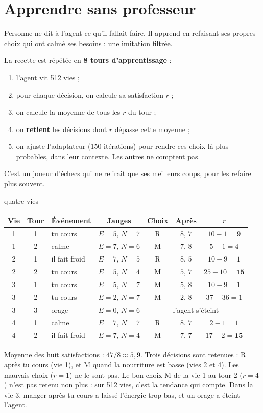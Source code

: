 \documentclass[fontsize=10pt,paper=a4,parskip=half-]{scrartcl}
\newcommand{\lead}[1]{{\fontsize{12}{16.5}\selectfont\color{ink!85!black}#1\par}\vspace{0.3em}}
\newcommand{\q}[1]{\og #1\fg{}}
\begin{document}
\section{Apprendre sans professeur}
\label{sec:apprendre}

\lead{Personne ne dit à l'agent ce qu'il fallait faire. Il apprend en refaisant ses
propres choix qui ont calmé ses besoins : une imitation filtrée.}

La recette est répétée en \textbf{8 tours d'apprentissage} :
\begin{enumerate}
  \item l'agent vit 512 vies ;
  \item pour chaque décision, on calcule sa satisfaction $r$ ;
  \item on calcule la moyenne de tous les $r$ du tour ;
  \item on \textbf{retient} les décisions dont $r$ dépasse cette moyenne ;
  \item on ajuste l'adaptateur (150 itérations) pour rendre ces choix-là plus probables,
  dans leur contexte. Les autres ne comptent pas.
\end{enumerate}
C'est un joueur d'échecs qui ne relirait que ses meilleurs coups, pour les refaire plus souvent.

\begin{calcul}{quatre vies}
\begin{center}\small
\begin{tabular}{cclcccc}
\toprule
Vie & Tour & Événement & Jauges & Choix & Après & $r$\\
\midrule
1 & 1 & tu cours & $E=5$, $N=7$ & R & $8$, $7$ & $10-1=\mathbf{9}$\\
1 & 2 & calme & $E=7$, $N=6$ & M & $7$, $8$ & $5-1=4$\\
2 & 1 & il fait froid & $E=7$, $N=5$ & R & $8$, $5$ & $10-9=1$\\
2 & 2 & tu cours & $E=5$, $N=4$ & M & $5$, $7$ & $25-10=\mathbf{15}$\\
3 & 1 & tu cours & $E=5$, $N=7$ & M & $5$, $8$ & $10-9=1$\\
3 & 2 & tu cours & $E=2$, $N=7$ & M & $2$, $8$ & $37-36=1$\\
3 & 3 & orage & $E=0$, $N=6$ & \multicolumn{3}{c}{l'agent s'éteint}\\
4 & 1 & calme & $E=7$, $N=7$ & R & $8$, $7$ & $2-1=1$\\
4 & 2 & il fait froid & $E=7$, $N=4$ & M & $7$, $7$ & $17-2=\mathbf{15}$\\
\bottomrule
\end{tabular}
\end{center}
Moyenne des huit satisfactions : $47/8 \approx 5,9$. Trois décisions sont retenues :
R après \q{tu cours} (vie 1), et M quand la nourriture est basse (vies 2 et 4). Les
mauvais choix ($r=1$) ne le sont pas. Le bon choix M de la vie 1 au tour 2 ($r=4$) n'est
pas retenu non plus : sur 512 vies, c'est la tendance qui compte. Dans la vie 3, manger
après \q{tu cours} a laissé l'énergie trop bas, et un orage a éteint l'agent.
\end{calcul}
\end{document}
